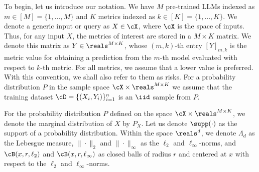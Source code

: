 To begin, let us introduce our notation. We have $M$ pre-trained LLMs indexed as $m \in [M] = \{1, \dots, M\}$ and $K$ metrics indexed as $k\in [K] = \{1, \dots, K\}$. %
We denote a generic input or query as $X\in \cX$, where $\cX$ is the space of inputs.  Thus, for any input $X$, the metrics of interest are stored in a $M\times K$ matrix. We denote this matrix as $Y \in \reals^{M \times K}$, whose $(m, k)$-th entry $[Y]_{m, k}$ is the metric value for obtaining a prediction from the $m$-th model evaluated with respect to $k$-th metric.  For all metrics, we assume that a lower value is preferred. With this convention, we shall also refer to them as risks. For a probability distribution $P$ in the sample space $\cX \times \reals^{M\times K}$ we assume that the training dataset $\cD= \{(X_i, Y_i)\}_{i = 1}^n$ is an $\iid$ sample from $P$. 

 For the probability distribution $P $ defined on the space $\cX \times \reals^{M \times K}$, we denote the marginal distribution of $X$ by $P_X$. Let us denote $\supp(\cdot)$ as the support of a probability distribution. Within the space $\reals^d$, we denote $\Lambda_d$ as the Lebesgue measure, $\|\cdot\|_2$ and $\|\cdot\|_\infty$ as the $\ell_2$ and $\ell_\infty$-norms, and $\cB(x, r, \ell_2)$ and $\cB(x, r, \ell_\infty)$ as closed balls of radius $r$ and centered at $x$ with respect to the $\ell_2$ and $\ell_\infty$-norms. 